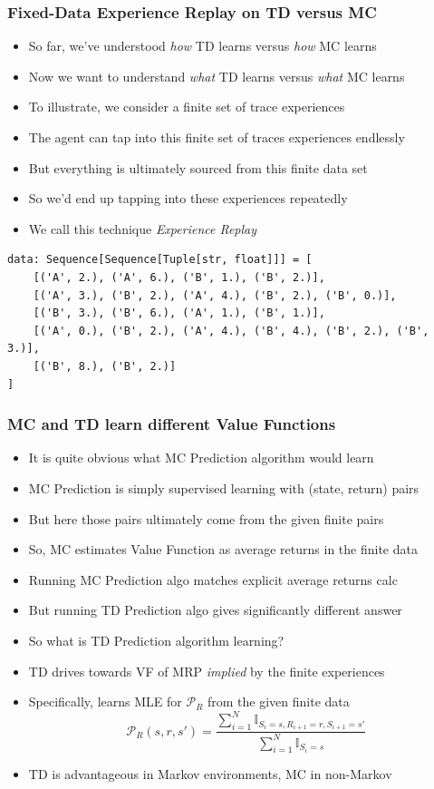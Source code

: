 \documentclass[handout]{beamer}
\begin{document}
\begin{frame}[fragile]
\frametitle{Fixed-Data Experience Replay on TD versus MC}
\pause
\begin{itemize}[<+->]
\item So far, we've understood {\em how} TD learns versus {\em how} MC learns
\item Now we want to understand {\em what} TD learns versus {\em what} MC learns
\item To illustrate, we consider a finite set of trace experiences
\item The agent can tap into this finite set of traces experiences endlessly
\item But everything is ultimately sourced from this finite data set
\item So we'd end up tapping into these experiences repeatedly
\item We call this technique {\em Experience Replay}
\end{itemize}
\pause
\begin{lstlisting}
data: Sequence[Sequence[Tuple[str, float]]] = [
    [('A', 2.), ('A', 6.), ('B', 1.), ('B', 2.)],
    [('A', 3.), ('B', 2.), ('A', 4.), ('B', 2.), ('B', 0.)],
    [('B', 3.), ('B', 6.), ('A', 1.), ('B', 1.)],
    [('A', 0.), ('B', 2.), ('A', 4.), ('B', 4.), ('B', 2.), ('B', 3.)],
    [('B', 8.), ('B', 2.)]
]
\end{lstlisting}
\end{frame}

\begin{frame}
\frametitle{MC and TD learn different Value Functions}
\pause
\begin{itemize}[<+->]
\item It is quite obvious what MC Prediction algorithm would learn
\item MC Prediction is simply supervised learning with (state, return) pairs
\item But here those pairs ultimately come from the given finite pairs
\item So, MC estimates Value Function as average returns in the finite data
\item Running MC Prediction algo matches explicit average returns calc
\item But running TD Prediction algo gives significantly different answer
\item So what is TD Prediction algorithm learning?
\item TD drives towards VF of MRP {\em implied} by the finite experiences
\item Specifically, learns MLE for $\mathcal{P}_R$ from the given finite data
$$\mathcal{P}_R(s,r,s') = \frac {\sum_{i=1}^N \mathbb{I}_{S_i=s,R_{i+1}=r,S_{i+1}=s'}} {\sum_{i=1}^N \mathbb{I}_{S_i=s}}$$
\item TD is advantageous in Markov environments, MC in non-Markov
\end{itemize}
\end{frame}
\end{document}
